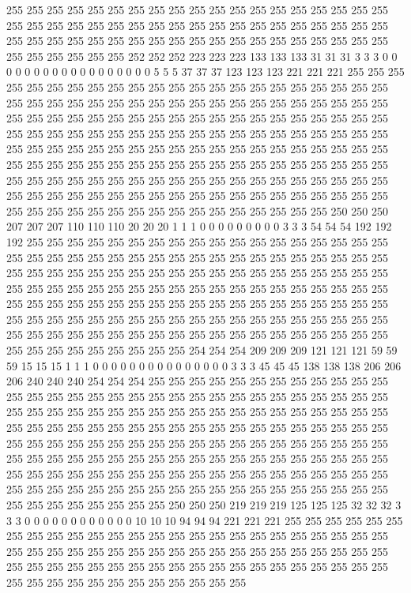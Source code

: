 255 255 255 255 255 255 255 255 255 255 255 255 255 255 255 255 255 255 255 255 255 255 255 255 255 255 255 255 255 255 255 255 255 255 255 255 255 255 255 255 255 255 255 255 255 255 255 255 255 255 255 255 255 255 255 255 255 255 255 255 255 255 255 252 252 252 223 223 223 133 133 133 31 31 31 3 3 3 0 0 0 0 0 0 0 0 0 0 0 0 0 0 0 0 0 0 5 5 5 37 37 37 123 123 123 221 221 221 255 255 255 255 255 255 255 255 255 255 255 255 255 255 255 255 255 255 255 255 
255 255 255 255 255 255 255 255 255 255 255 255 255 255 255 255 255 255 255 255 255 255 255 255 255 255 255 255 255 255 255 255 255 255 255 255 255 255 255 255 255 255 255 255 255 255 255 255 255 255 255 255 255 255 255 255 255 255 255 255 255 255 255 255 255 255 255 255 255 255 255 255 255 255 255 255 255 255 255 255 255 255 255 255 255 255 255 255 255 255 255 255 255 255 255 255 255 255 255 255 255 255 255 255 255 255 255 255 255 255 255 255 255 255 255 255 255 255 255 255 255 255 255 255 255 255 255 255 
255 255 255 255 255 255 255 255 255 255 255 255 255 255 255 255 255 255 255 255 255 255 255 250 250 250 207 207 207 110 110 110 20 20 20 1 1 1 0 0 0 0 0 0 0 0 0 3 3 3 54 54 54 192 192 192 255 255 255 255 255 255 255 255 255 255 255 255 255 255 255 255 255 255 255 255 255 255 255 255 255 255 255 255 255 255 255 255 255 255 255 255 255 255 255 255 255 255 255 255 255 255 255 255 255 255 255 255 255 255 255 255 255 255 255 255 255 255 255 255 255 255 255 255 255 255 255 255 
255 255 255 255 255 255 255 255 255 255 255 255 255 255 255 255 255 255 255 255 255 255 255 255 255 255 255 255 255 255 255 255 255 255 255 255 255 255 255 255 255 255 255 255 255 255 255 255 255 255 255 255 255 255 255 255 255 255 255 255 255 255 255 255 255 255 255 255 255 254 254 254 209 209 209 121 121 121 59 59 59 15 15 15 1 1 1 0 0 0 0 0 0 0 0 0 0 0 0 0 0 0 3 3 3 45 45 45 138 138 138 206 206 206 240 240 240 254 254 254 255 255 255 255 255 255 255 255 
255 255 255 255 255 255 255 255 255 255 255 255 255 255 255 255 255 255 255 255 255 255 255 255 255 255 255 255 255 255 255 255 255 255 255 255 255 255 255 255 255 255 255 255 255 255 255 255 255 255 255 255 255 255 255 255 255 255 255 255 255 255 255 255 255 255 255 255 255 255 255 255 255 255 255 255 255 255 255 255 255 255 255 255 255 255 255 255 255 255 255 255 255 255 255 255 255 255 255 255 255 255 255 255 255 255 255 255 255 255 255 255 255 255 255 255 255 255 255 255 255 255 255 255 255 255 255 255 
255 255 255 255 255 255 255 255 255 255 255 255 255 255 255 255 255 250 250 250 219 219 219 125 125 125 32 32 32 3 3 3 0 0 0 0 0 0 0 0 0 0 0 0 10 10 10 94 94 94 221 221 221 255 255 255 255 255 255 255 255 255 255 255 255 255 255 255 255 255 255 255 255 255 255 255 255 255 255 255 255 255 255 255 255 255 255 255 255 255 255 255 255 255 255 255 255 255 255 255 255 255 255 255 255 255 255 255 255 255 255 255 255 255 255 255 255 255 255 255 255 255 255 255 255 255 255 255 
